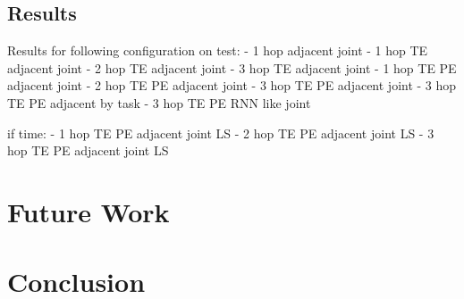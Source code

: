 \documentclass[twoside,11pt]{article}
\begin{document}
\subsection{Results}
Results for following configuration on test:
- 1 hop adjacent joint
- 1 hop TE adjacent joint
- 2 hop TE adjacent joint
- 3 hop TE adjacent joint
- 1 hop TE PE adjacent joint
- 2 hop TE PE adjacent joint
- 3 hop TE PE adjacent joint
- 3 hop TE PE adjacent by task
- 3 hop TE PE RNN like joint

if time:
- 1 hop TE PE adjacent joint LS
- 2 hop TE PE adjacent joint LS
- 3 hop TE PE adjacent joint LS

\section{Future Work}

\section{Conclusion}


\vskip 0.2in

\end{document}
